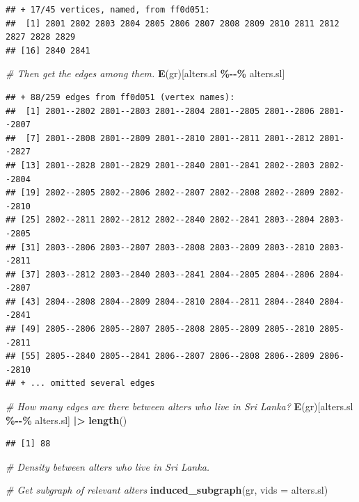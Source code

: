 \documentclass[
]{book}
\newenvironment{Shaded}{\begin{snugshade}}{\end{snugshade}}
\newcommand{\AttributeTok}[1]{\textcolor[rgb]{0.13,0.29,0.53}{#1}}
\newcommand{\CommentTok}[1]{\textcolor[rgb]{0.56,0.35,0.01}{\textit{#1}}}
\newcommand{\FunctionTok}[1]{\textcolor[rgb]{0.13,0.29,0.53}{\textbf{#1}}}
\newcommand{\NormalTok}[1]{#1}
\newcommand{\SpecialCharTok}[1]{\textcolor[rgb]{0.81,0.36,0.00}{\textbf{#1}}}
\begin{document}
\begin{verbatim}
## + 17/45 vertices, named, from ff0d051:
##  [1] 2801 2802 2803 2804 2805 2806 2807 2808 2809 2810 2811 2812 2827 2828 2829
## [16] 2840 2841
\end{verbatim}

\begin{Shaded}
\begin{Highlighting}[]
\CommentTok{\# Then get the edges among them.}
\FunctionTok{E}\NormalTok{(gr)[alters.sl }\SpecialCharTok{\%{-}{-}\%}\NormalTok{ alters.sl]}
\end{Highlighting}
\end{Shaded}

\begin{verbatim}
## + 88/259 edges from ff0d051 (vertex names):
##  [1] 2801--2802 2801--2803 2801--2804 2801--2805 2801--2806 2801--2807
##  [7] 2801--2808 2801--2809 2801--2810 2801--2811 2801--2812 2801--2827
## [13] 2801--2828 2801--2829 2801--2840 2801--2841 2802--2803 2802--2804
## [19] 2802--2805 2802--2806 2802--2807 2802--2808 2802--2809 2802--2810
## [25] 2802--2811 2802--2812 2802--2840 2802--2841 2803--2804 2803--2805
## [31] 2803--2806 2803--2807 2803--2808 2803--2809 2803--2810 2803--2811
## [37] 2803--2812 2803--2840 2803--2841 2804--2805 2804--2806 2804--2807
## [43] 2804--2808 2804--2809 2804--2810 2804--2811 2804--2840 2804--2841
## [49] 2805--2806 2805--2807 2805--2808 2805--2809 2805--2810 2805--2811
## [55] 2805--2840 2805--2841 2806--2807 2806--2808 2806--2809 2806--2810
## + ... omitted several edges
\end{verbatim}

\begin{Shaded}
\begin{Highlighting}[]
\CommentTok{\# How many edges are there between alters who live in Sri Lanka?}
\FunctionTok{E}\NormalTok{(gr)[alters.sl }\SpecialCharTok{\%{-}{-}\%}\NormalTok{ alters.sl] }\SpecialCharTok{|\textgreater{}} 
  \FunctionTok{length}\NormalTok{()}
\end{Highlighting}
\end{Shaded}

\begin{verbatim}
## [1] 88
\end{verbatim}

\begin{Shaded}
\begin{Highlighting}[]
\CommentTok{\# Density between alters who live in Sri Lanka.}

\CommentTok{\# Get subgraph of relevant alters}
\FunctionTok{induced\_subgraph}\NormalTok{(gr, }\AttributeTok{vids =}\NormalTok{ alters.sl)}
\end{Highlighting}
\end{Shaded}
\end{document}
